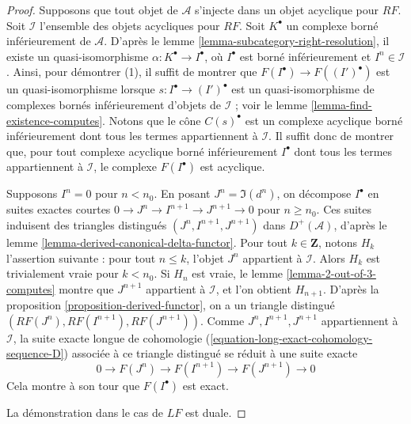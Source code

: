 \begin{proof}
Supposons que tout objet de $\mathcal{A}$ s'injecte dans un objet acyclique
pour $RF$. Soit $\mathcal{I}$ l'ensemble des objets acycliques pour $RF$.
Soit $K^\bullet$ un complexe borné inférieurement de $\mathcal{A}$. D'après le
lemme \ref{lemma-subcategory-right-resolution}, il existe un
quasi-isomorphisme $\alpha : K^\bullet \to I^\bullet$, où $I^\bullet$ est
borné inférieurement et $I^n \in \mathcal{I}$. Ainsi, pour démontrer (1), il
suffit de montrer que $F(I^\bullet) \to F((I')^\bullet)$ est un
quasi-isomorphisme lorsque $s : I^\bullet \to (I')^\bullet$ est un
quasi-isomorphisme de complexes bornés inférieurement d'objets de
$\mathcal{I}$ ; voir le lemme \ref{lemma-find-existence-computes}. Notons que
le cône $C(s)^\bullet$ est un complexe acyclique borné inférieurement dont tous
les termes appartiennent à $\mathcal{I}$. Il suffit donc de montrer que, pour
tout complexe acyclique borné inférieurement $I^\bullet$ dont tous les termes
appartiennent à $\mathcal{I}$, le complexe $F(I^\bullet)$ est acyclique.

\medskip\noindent
Supposons $I^n = 0$ pour $n < n_0$. En posant $J^n = \Im(d^n)$, on décompose
$I^\bullet$ en suites exactes courtes
$0 \to J^n \to I^{n + 1} \to J^{n + 1} \to 0$ pour $n \geq n_0$.
Ces suites induisent des triangles distingués
$(J^n, I^{n + 1}, J^{n + 1})$ dans $D^+(\mathcal{A})$, d'après le
lemme \ref{lemma-derived-canonical-delta-functor}. Pour tout
$k \in \mathbf{Z}$, notons $H_k$ l'assertion suivante : pour tout $n \leq k$,
l'objet $J^n$ appartient à $\mathcal{I}$. Alors $H_k$ est trivialement vraie
pour $k < n_0$. Si $H_n$ est vraie, le
lemme \ref{lemma-2-out-of-3-computes} montre que $J^{n + 1}$ appartient à
$\mathcal{I}$, et l'on obtient $H_{n + 1}$. D'après la
proposition \ref{proposition-derived-functor}, on a un triangle distingué
$(RF(J^n), RF(I^{n + 1}), RF(J^{n + 1}))$. Comme
$J^n, I^{n + 1}, J^{n + 1}$ appartiennent à $\mathcal{I}$, la suite exacte
longue de cohomologie (\ref{equation-long-exact-cohomology-sequence-D})
associée à ce triangle distingué se réduit à une suite exacte
$$
0 \to F(J^n) \to F(I^{n + 1}) \to F(J^{n + 1}) \to 0
$$
Cela montre à son tour que $F(I^\bullet)$ est exact.

\medskip\noindent
La démonstration dans le cas de $LF$ est duale.
\end{proof}

